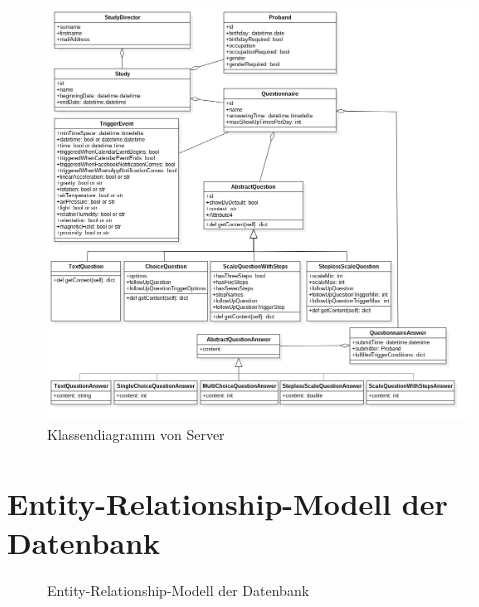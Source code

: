 \documentclass[a4paper]{scrreprt}
\begin{document}
        \newpage
        \vspace*{1cm}
        	\begin{figure}[H]
                        \centering
                        \includegraphics[scale = 1]{ClassDiagramServer.jpg}
                        \caption{Klassendiagramm von Server}
        	 \end{figure}

        \newpage
        \section{Entity-Relationship-Modell der Datenbank}
            \begin{figure}[ht]
                \centering
                \caption{Entity-Relationship-Modell der Datenbank}
            \end{figure}
\end{document}

